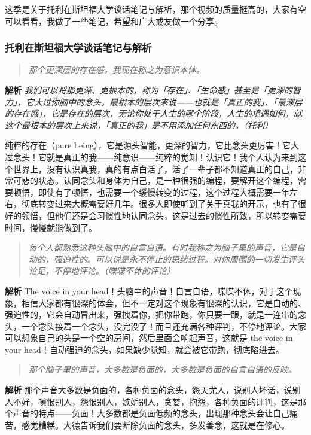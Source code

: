 这季是关于托利在斯坦福大学谈话笔记与解析，那个视频的质量挺高的，大家有空可以看看，我做了一些笔记，希望和广大戒友做一个分享。

\subsubsection{托利在斯坦福大学谈话笔记与解析}

\begin{quote}\it
    那个更深层的存在感，我现在称之为意识本体。
\end{quote}

\textbf{解析} \textit{我们可以将那更深、更根本的，称为「存在」、「生命感」甚至是「更深的智力」，它大过你脑中的念头。最根本的层次来说——也就是「真正的我」、「最深层的存在感」，它是存在的层次，无论你处于人生的哪个阶段，人生的境遇如何，就这个最根本的层次上来说，「真正的我」是不用添加任何东西的。（托利）}

纯粹的存在（pure being），它是源头智能，更深的智力，它比念头更厉害！它大过念头！它就是真正的我——纯意识——纯粹的觉知！认识它！我个人认为来到这个世界上，没有认识真我，真的有点白活了，活了一辈子都不知道真正的自己，非常可悲的状态。认同念头和身体为自己，是一种很强的编程，要解开这个编程，需要顿悟，即使有了顿悟，也需要一个缓慢转变的过程，这个过程大概需要一年左右，彻底转变过来大概需要好几年。很多人即使听到了关于真我的开示，也有了很好的领悟，但他们还是会习惯性地认同念头，这是过去的惯性所致，所以转变需要时间，慢慢就能做到了。

\begin{quote}\it
    每个人都熟悉这种头脑中的自言自语。有时我称之为脑子里的声音，它是自动的，强迫性的。可以说是永不停止的思绪过程。对你周围的一切发生评头论足，不停地评论。（喋喋不休的评论）
\end{quote}

\textbf{解析} The voice in your head！头脑中的声音！自言自语，喋喋不休，对于这个现象，相信大家都有很深的体会，但不一定对这个现象有很深的认识，它是自动的、强迫性的，它会自动冒出来，强拽着你，把你带跑，你只要一跟，就是一连串的念头，一个念头接着一个念头，没完没了！而且还充满各种评判，不停地评论。大家可以想象自己的头是一个空的房间，然后里面会响起声音，这就是 the voice in your head！自动强迫的念头，如果缺少觉知，就会被它带跑，彻底陷进去。

\begin{quote}\it
    那个脑子里的声音，大多数是负面的，大多数是负面的自言自语的反映。
\end{quote}

\textbf{解析} 那个声音大多数是负面的，各种负面的念头，怨天尤人，说别人坏话，说别人不好，嗔恨别人，怨恨别人，嫉妒别人，贪婪，抱怨，各种负面的评判，这是那个声音的特点——负面！大多数都是负面低频的念头，出现那种念头会让自己痛苦，感觉糟糕。大德告诉我们要断除负面的念头，多发善念，这就是在修心。

